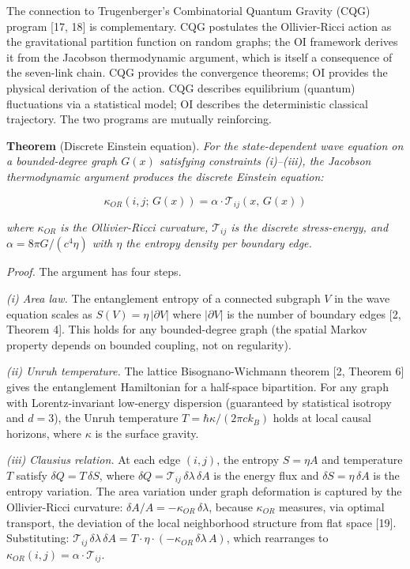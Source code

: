 \documentclass[
  11pt,
]{article}
\begin{document}
The connection to Trugenberger's Combinatorial Quantum Gravity (CQG)
program {[}17, 18{]} is complementary. CQG postulates the Ollivier-Ricci
action as the gravitational partition function on random graphs; the OI
framework derives it from the Jacobson thermodynamic argument, which is
itself a consequence of the seven-link chain. CQG provides the
convergence theorems; OI provides the physical derivation of the action.
CQG describes equilibrium (quantum) fluctuations via a statistical
model; OI describes the deterministic classical trajectory. The two
programs are mutually reinforcing.

\textbf{Theorem} (Discrete Einstein equation). \emph{For the
state-dependent wave equation on a bounded-degree graph \(G(x)\)
satisfying constraints (i)--(iii), the Jacobson thermodynamic argument
produces the discrete Einstein equation:}

\[\kappa_{OR}(i, j;\, G(x)) = \alpha \cdot \mathcal{T}_{ij}(x,\, G(x))\]

\emph{where \(\kappa_{OR}\) is the Ollivier-Ricci curvature,
\(\mathcal{T}_{ij}\) is the discrete stress-energy, and
\(\alpha = 8\pi G/(c^4 \eta)\) with \(\eta\) the entropy density per
boundary edge.}

\emph{Proof.} The argument has four steps.

\emph{(i) Area law.} The entanglement entropy of a connected subgraph
\(V\) in the wave equation scales as \(S(V) = \eta\,|\partial V|\) where
\(|\partial V|\) is the number of boundary edges {[}2, Theorem 4{]}.
This holds for any bounded-degree graph (the spatial Markov property
depends on bounded coupling, not on regularity).

\emph{(ii) Unruh temperature.} The lattice Bisognano-Wichmann theorem
{[}2, Theorem 6{]} gives the entanglement Hamiltonian for a half-space
bipartition. For any graph with Lorentz-invariant low-energy dispersion
(guaranteed by statistical isotropy and \(d = 3\)), the Unruh
temperature \(T = \hbar\kappa/(2\pi c k_B)\) holds at local causal
horizons, where \(\kappa\) is the surface gravity.

\emph{(iii) Clausius relation.} At each edge \((i,j)\), the entropy
\(S = \eta A\) and temperature \(T\) satisfy \(\delta Q = T\,\delta S\),
where \(\delta Q = \mathcal{T}_{ij}\,\delta\lambda\,\delta A\) is the
energy flux and \(\delta S = \eta\,\delta A\) is the entropy variation.
The area variation under graph deformation is captured by the
Ollivier-Ricci curvature:
\(\delta A / A = -\kappa_{OR}\,\delta\lambda\), because \(\kappa_{OR}\)
measures, via optimal transport, the deviation of the local neighborhood
structure from flat space {[}19{]}. Substituting:
\(\mathcal{T}_{ij}\,\delta\lambda\,\delta A = T \cdot \eta \cdot (-\kappa_{OR}\,\delta\lambda\,A)\),
which rearranges to
\(\kappa_{OR}(i,j) = \alpha \cdot \mathcal{T}_{ij}\).
\end{document}
